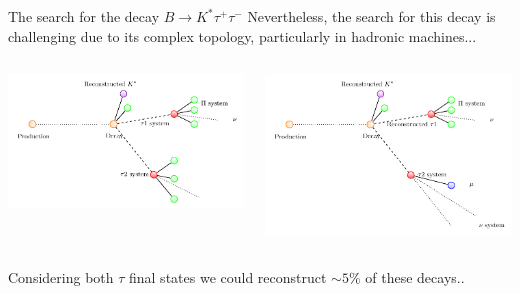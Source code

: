 \documentclass[9pt,usenames,dvipsnames]{beamer}
\begin{document}
\begin{frame}{The search for the decay $ B \to K^* \tau^+ \tau^-$ }
Nevertheless, the search for this decay is challenging due to its complex topology, particularly in hadronic machines... 
	\begin{columns}[c]
		\begin{center}
		\includegraphics[width= \textwidth]{./assets/topology1}
		\end{center}
		\begin{center}
		\includegraphics[width= \textwidth]{./assets/topology2}
			\end{center}
	\end{columns}
\pause
Considering both $\tau$ final states we could reconstruct $\sim 5 \%$ of these decays.. 
\end{frame}
%
\end{document}
